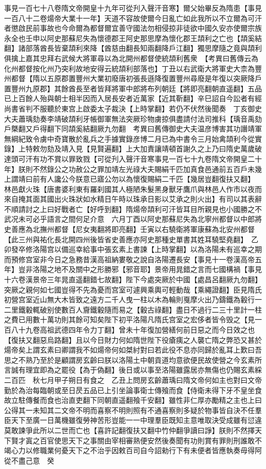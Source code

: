 事見一百七十八卷隋文帝開皇十九年可從刋入聲汗音寒】爾父始畢反為隋患【事見一百八十二卷煬帝大業十一年】天道不容故使爾今日亂亡如此我所以不立爾為可汗者懲啟民前事故也今命爾為都督爾宜善守國法勿相侵掠非徒欲中國久安亦使爾宗族永全也壬申以阿史那蘇尼失為懷德郡王阿史那思摩為懷化郡王頡利之亡也【頡奚結翻】諸部落酋長皆棄頡利來降【酋慈由翻長知兩翻降戶江翻】獨思摩隨之竟與頡利俱擒上嘉其忠拜右武候大將軍尋以為北開州都督使統頡利舊衆　【考異曰舊傳云為化州都督按化州乃突利故地安得云統頡利部落也】丁丑以右武衛大將軍史大柰為豐州都督【隋以五原郡置豐州大業初廢唐初張長遜降復置豐州尋廢是年復以突厥降戶置豐州九原郡】其餘酋長至者皆拜將軍中郎將布列朝廷【將即亮翻朝直遥翻】五品已上百餘人殆與朝士相半因而入居長安者近萬家【近其靳翻】辛巳詔自今訟者有經尚書省判不服聽於東宫上啟委太子裁決【上時掌翻】若仍不伏然後聞奏　丁亥御史大夫蕭瑀劾奏李靖破頡利牙帳御軍無法突厥珍物虜掠俱盡請付法司推科【瑀音禹劾戶槩翻又戶得翻下同頡奚結翻厥九勿翻　考異曰舊傳御史大夫温彦博害其功譖靖軍無綱紀致令虜中奇寶散於亂兵之手據實錄彦博二月已為中書令三月始禽頡利今從實錄】上特敕勿劾及靖入見【見賢遍翻】上大加責讓靖頓首謝久之上乃曰隋史萬歲破達頭可汗有功不賞以罪致戮【可從刋入聲汗音寒事見一百七十九卷隋文帝開皇二十年】朕則不然錄公之功赦公之罪加靖左光祿大夫賜絹千匹加真食邑通前五百戶未幾上謂靖曰前有人讒公今朕意已寤公勿以為懷復賜絹二千匹【幾居豈翻復扶又翻】　林邑獻火珠【唐書婆利東有羅刹國其人極陋朱髮黑身獸牙鷹爪與林邑人作市以夜而來自掩其面其國出火珠狀如水精日午時以珠承日影以艾承之則火出】有司以其表辭不順請討之上曰好戰者亡【好呼到翻】隋煬帝頡利可汗皆耳目所親見也小國勝之不武况未可必乎語言之間何足介意　六月丁酉以阿史那蘇尼失為北寧州都督以中郎將史善應為北撫州都督【尼女夷翻將即亮翻】壬寅以右驍衛將軍康蘇為北安州都督【此三州與祐化長北開四州後皆省史善應亦阿史那種史單書其姓耳驍堅堯翻】　乙卯發卒修洛陽宫以備巡幸給事中張玄素上書諫【上時掌翻】以為洛陽未有巡幸之期而預修宫室非今日之急務昔漢高祖納婁敬之說自洛陽遷長安【事見十一卷漢高帝五年】豈非洛陽之地不及關中之形勝邪【邪音耶】景帝用晁錯之言而七國構禍【事見十六卷漢景帝三年晁直遥翻錯七故翻】陛下今處突厥於中國【處昌呂翻厥九勿翻】突厥之親何如七國豈得不先為憂而宫室可遽興乘輿可輕動哉【乘繩證翻】臣見隋氏初營宫室近山無大木皆致之遠方二千人曳一柱以木為輪則戛摩火出乃鑄鐵為轂行一二里鐵轂輒破别使數百人齎鐵轂隨而易之【轂古祿翻】盡日不過行二三十里計一柱之費已用數十萬功則其餘可知矣陛下初平洛陽凡隋氏宫室之宏侈者皆令毁之【見一百八十九卷高祖武德四年令力丁翻】曾未十年復加營繕何前日惡之而今日效之也【復扶又翻惡烏路翻】且以今日財力何如隋世陛下役瘡痍之人襲亡隋之弊恐又甚於煬帝矣上謂玄素曰卿謂我不如煬帝何如桀紂對曰若此役不息亦同歸於亂耳上歎曰吾思之不熟乃至於是顧謂房玄齡曰朕以洛陽土中朝貢道均意欲便民故使營之今玄素所言誠有理宜即為之罷役【為于偽翻】後日或以事至洛陽雖露居亦無傷也仍賜玄素綵二百匹　秋七月甲子朔日有食之　乙丑上問房玄齡蕭瑀曰隋文帝何如主也對曰文帝勤於為治每臨朝或至日昃五品已上引坐論事衛士傳飱而食【侍衛未得下牙不皇坐食故立駐傳餐而食也治直吏翻下同朝直遥翻飱千安翻】雖性非仁厚亦勵精之主也上曰公得其一未知其二文帝不明而喜察不明則照有不通喜察則多疑於物事皆自決不任羣臣天下至廣一日萬機雖復勞神苦形豈能一一中理羣臣既知主意唯取決受成雖有愆違莫敢諫爭此所以二世而亡也【喜許記翻復扶又翻中竹仲翻爭讀曰諍】朕則不然擇天下賢才寘之百官使思天下之事關由宰相審熟便安然後奏聞有功則賞有罪則刑誰敢不竭心力以修職業何憂天下之不治乎因敕百司自今詔勑行下有未便者皆應執奏毋得阿從不盡己意　癸